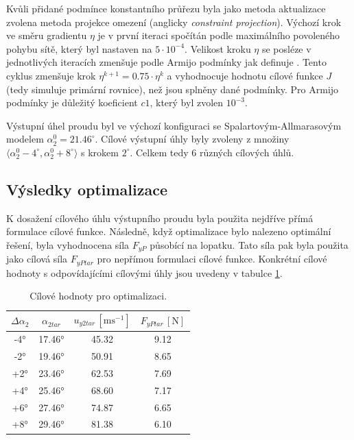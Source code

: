 Kvůli přidané podmínce konstantního průřezu byla jako metoda aktualizace zvolena metoda projekce omezení (anglicky \textit{constraint projection}). Výchozí krok ve směru gradientu $ \eta $ je v první iteraci spočítán podle maximálního povoleného pohybu sítě, který byl nastaven na $ 5\cdot10^{-4} $. Velikost kroku $ \eta $ se posléze v jednotlivých iteracích zmenšuje podle Armijo podmínky jak definuje \cite{nocedal1999numerical}. Tento cyklus zmenšuje krok $ \eta^{k+1}=0.75\cdot\eta^{k} $ a vyhodnocuje hodnotu cílové funkce $ J $ (tedy simuluje primární rovnice), než jsou splněny dané podmínky. Pro Armijo podmínky je důležitý koeficient $ c1 $, který byl zvolen $ 10^{-3} $.

Výstupní úhel proudu byl ve výchozí konfiguraci se Spalartovým-Allmarasovým modelem $ \alpha_{2}^{0}=21.46^{\circ} $. Cílové výstupní úhly byly zvoleny z množiny $ \langle \alpha_{2}^{0}-4^{\circ}, \alpha_{2}^{0}+8^{\circ} \rangle $ s krokem $ 2^{\circ} $. Celkem tedy 6 různých cílových úhlů.

\subsection{Výsledky optimalizace} \label{sec:vysledky_opt}
K dosažení cílového úhlu výstupního proudu byla použita nejdříve přímá formulace cílové funkce. Následně, když optimalizace bylo nalezeno optimální řešení, byla vyhodnocena síla $ F_{yP} $ působící na lopatku. Tato síla pak byla použita jako cílová síla $ F_{yPtar} $ pro nepřímou formulaci cílové funkce. Konkrétní cílové hodnoty s odpovídajícími cílovými úhly jsou uvedeny v tabulce \ref{tab:cilove_hodnoty}.

\begin{table}[H]
	\begin{ctucolortab}
		\begin{tabular}{c|c||c|c}
			
			$ \Delta\alpha_{2} $ &$ \alpha_{2tar} $ & $ u_{y2tar}\,[\mathrm{ms^{-1}}] $ & $ F_{yPtar}\,[\mathrm{N}] $ \\
			\hline
			-4° & 17.46° & 45.32 & 9.12 \\
			
			-2° & 19.46° & 50.91 & 8.65 \\
			
			+2° & 23.46° & 62.53 & 7.69 \\
			
			+4° & 25.46° & 68.60 & 7.17 \\
			
			+6° & 27.46° & 74.87 & 6.65 \\
			
			+8° & 29.46° & 81.38 & 6.10 \\
			
		\end{tabular}
	\end{ctucolortab}
	\caption{Cílové hodnoty pro optimalizaci.}
	\label{tab:cilove_hodnoty}
\end{table}

